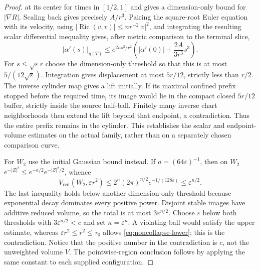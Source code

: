 \begin{proof}
at its center for times in $[1/2,1]$ and gives a dimension-only bound for
$|\nabla R|$.  Scaling back gives precisely $A/r^3$.
Pairing the square-root Euler equation with its velocity,
using $|\operatorname{Ric}(v,v)|\leq nr^{-2}|v|^2$, and integrating the
resulting scalar differential inequality gives, after metric comparison to
the terminal slice,
\[
 |\alpha'(s)|_{g(T)}\leq
 e^{2ns^2/r^2}\left(|\alpha'(0)|+\frac{2A}{3r^3}s^3\right).
\]
For $s\leq\sqrt\varepsilon r$ choose the dimension-only threshold so
that this is at most $5/(12\sqrt\varepsilon)$.
Integration gives displacement at most $5r/12$, strictly less than $r/2$.
The inverse cylinder map gives a lift initially.
If its maximal confined prefix stopped before the required time, its image
would lie in the compact closed $5r/12$ buffer, strictly inside the source
half-ball.  Finitely many inverse chart neighborhoods then extend the lift
beyond that endpoint, a contradiction.  Thus the entire prefix remains
in the cylinder.  This establishes the scalar and endpoint-volume estimates
on the actual family, rather than on a separately chosen comparison curve.

For $W_2$ use the initial Gaussian bound instead.  If $a=(64\varepsilon)^{-1}$,
then on $W_2$
$e^{-|Z|^2}\leq e^{-a/2}e^{-|Z|^2/2}$, whence
\[
 V_{\mathrm{red}}(W_2,\varepsilon r^2)
 \leq 2^n(2\pi)^{n/2}e^{-1/(128\varepsilon)}
 \leq\varepsilon^{n/2}.
\]
The last inequality holds below another dimension-only threshold because
exponential decay dominates every positive power.  Disjoint stable images
have additive reduced volume, so the total is at most
$3\varepsilon^{n/2}$.  Choose $\varepsilon$ below both thresholds with
$3\varepsilon^{n/2}<c$ and set $\kappa=\varepsilon^n$.  A violating
ball would satisfy the upper estimate, whereas
$\varepsilon r^2\leq r^2\leq\tau_0$ allows
\eqref{eq:noncollapse-lower}; this is the contradiction.  Notice that the
positive number in the contradiction is $c$, not the unweighted volume $V$.
The pointwise-region conclusion follows by applying the same constant to
each supplied configuration.


\end{proof}
